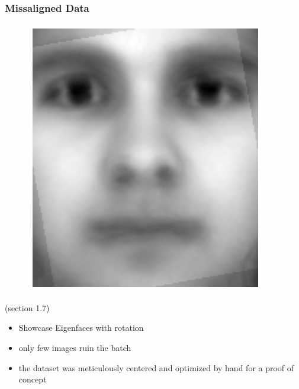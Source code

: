 \subsubsection{Missaligned Data}


\begin{center}
    \begin{figure}[h]
      \centering
      \includegraphics[width=0.94\linewidth]{external_content/media/rotation/average_face-rotation.png}
      \captionsetup{justification=centering}
    \end{figure}
\end{center}


\cite{brunton2019data} (section 1.7)

\begin{itemize}
	\item Showcase Eigenfaces with rotation
	\item only few images ruin the batch
	\item the dataset was meticulously centered and optimized by hand for a proof of concept
\end{itemize}

\clearpage




